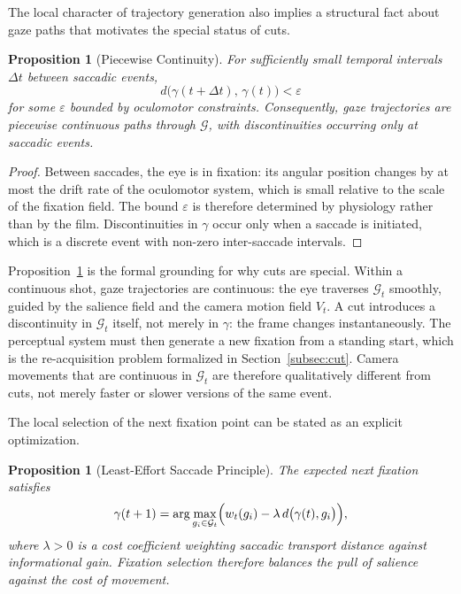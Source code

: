 \documentclass[12pt, a4paper]{article}
\theoremstyle{plain}
\newtheorem{proposition}[theorem]{Proposition}
\theoremstyle{definition}
\theoremstyle{remark}
\newcommand{\G}{\mathcal{G}}
\newcommand{\traj}{\gamma}
\newcommand{\salience}{w}
\begin{document}
The local character of trajectory generation also implies
a structural fact about gaze paths that motivates the
special status of cuts.

\begin{proposition}[Piecewise Continuity]
\label{prop:piecewise_continuity}
  For sufficiently small temporal intervals $\Delta t$
  between saccadic events,
  \begin{equation}
    d\bigl(\traj(t + \Delta t),\, \traj(t)\bigr)
    < \varepsilon
  \end{equation}
  for some $\varepsilon$ bounded by oculomotor constraints.
  Consequently, gaze trajectories are piecewise continuous
  paths through $\G$, with discontinuities occurring only
  at saccadic events.
\end{proposition}

\begin{proof}
  Between saccades, the eye is in fixation: its angular
  position changes by at most the drift rate of the
  oculomotor system, which is small relative to the scale
  of the fixation field. The bound $\varepsilon$ is
  therefore determined by physiology rather than by the
  film. Discontinuities in $\traj$ occur only when a
  saccade is initiated, which is a discrete event with
  non-zero inter-saccade intervals.
\end{proof}

Proposition~\ref{prop:piecewise_continuity} is the formal
grounding for why cuts are special. Within a continuous
shot, gaze trajectories are continuous: the eye traverses
$\G_t$ smoothly, guided by the salience field and the
camera motion field $V_t$. A cut introduces a discontinuity
in $\G_t$ itself, not merely in $\traj$: the frame changes
instantaneously. The perceptual system must then generate
a new fixation from a standing start, which is the
re-acquisition problem formalized in
Section~\ref{subsec:cut}. Camera movements that are
continuous in $\G_t$ are therefore qualitatively different
from cuts, not merely faster or slower versions of the
same event.

The local selection of the next fixation point can be
stated as an explicit optimization.

\begin{proposition}[Least-Effort Saccade Principle]
\label{prop:least_effort}
  The expected next fixation satisfies
  \begin{equation}
    \traj(t+1)
    = \arg\max_{g_i \in \G_t}
      \Bigl(
        \salience_t(g_i)
        - \lambda\, d\bigl(\traj(t), g_i\bigr)
      \Bigr),
    \label{eq:least_effort}
  \end{equation}
  where $\lambda > 0$ is a cost coefficient weighting
  saccadic transport distance against informational gain.
  Fixation selection therefore balances the pull of salience
  against the cost of movement.
\end{proposition}
\end{document}
